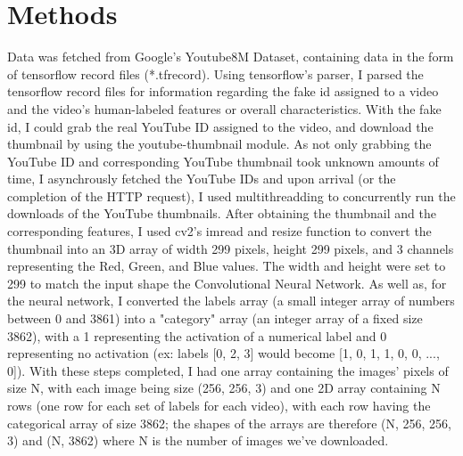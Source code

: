 \documentclass[10pt,twocolumn]{article}
\begin{document}

\section {Methods}

Data was fetched from Google's Youtube8M Dataset, containing data in the form of tensorflow record files (*.tfrecord). Using tensorflow's parser, I parsed the tensorflow record files for information regarding the fake id assigned to a video and the video's human-labeled features or overall characteristics. With the fake id, I could grab the real YouTube ID assigned to the video, and download the thumbnail by using the youtube-thumbnail module. As not only grabbing the YouTube ID and corresponding YouTube thumbnail took unknown amounts of time, I asynchrously fetched the YouTube IDs and upon arrival (or the completion of the HTTP request), I used multithreadding to concurrently run the downloads of the YouTube thumbnails. After obtaining the thumbnail and the corresponding features, I used cv2's imread and resize function to convert the thumbnail into an 3D array of width 299 pixels, height 299 pixels, and 3 channels representing the Red, Green, and Blue values. The width and height were set to 299 to match the input shape the Convolutional Neural Network. As well as, for the neural network, I converted the labels array (a small integer array of numbers between 0 and 3861) into a "category" array (an integer array of a fixed size 3862), with a 1 representing the activation of a numerical label and 0 representing no activation (ex: labels [0, 2, 3] would become [1, 0, 1, 1, 0, 0, ..., 0]). With these steps completed, I had one array containing the images' pixels of size N, with each image being size (256, 256, 3) and one 2D array containing N rows (one row for each set of labels for each video), with each row having the categorical array of size 3862; the shapes of the arrays are therefore (N, 256, 256, 3) and (N, 3862) where N is the number of images we've downloaded.
\end{document}
